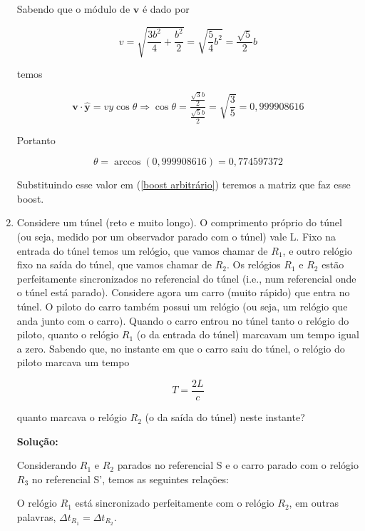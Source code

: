 \documentclass[10pt,a4paper]{article}
\begin{document}
\begin{enumerate}
Sabendo que o módulo de $\mathbf{v}$ é dado por 

\begin{equation}
v = \sqrt{\frac{3b^2}{4}+\frac{b^2}{2}} = \sqrt{\frac{5}{4}b^2} = \frac{\sqrt{5}}{2}b
\end{equation}

temos

\begin{equation}
\mathbf{v}\cdot\mathbf{\hat{y}} = vy\cos\theta \Rightarrow \cos\theta = \frac{\frac{\sqrt{3}b}{2}}{\frac{\sqrt{5}b}{2}} = \sqrt{\frac{3}{5}} = 0,999908616 
\end{equation}

Portanto 

\begin{equation}
\theta = \arccos(0,999908616) = 0,774597372
\end{equation}
	
	
Substituindo esse valor em (\ref{boost arbitrário}) teremos a matriz que faz esse boost.
	\item Considere um túnel (reto e muito longo). O comprimento próprio do túnel (ou seja, medido por um observador parado com o túnel) vale L. Fixo na entrada do túnel temos um relógio, que vamos chamar de $R_1$, e outro relógio fixo na saída do túnel, que vamos chamar de $R_2$. Os relógios $R_1$ e $R_2$ estão perfeitamente sincronizados no referencial do túnel (i.e., num referencial onde o túnel está parado). Considere agora um carro (muito rápido) que entra no túnel. O piloto do carro também possui um relógio (ou seja, um relógio que anda junto com o carro). Quando o carro entrou no túnel tanto o relógio do piloto, quanto o relógio $R_1$ (o da entrada do túnel) marcavam um tempo igual a zero. Sabendo que, no instante em que o carro saiu do túnel, o relógio do piloto marcava um tempo
	
	\begin{equation}
	T = \frac{2L}{c}
	\end{equation}
	
	quanto marcava o relógio $R_2$ (o da saída do túnel) neste instante?
	
	\textbf{Solução:}
	
	Considerando $ R_1 $ e $ R_2 $ parados no referencial S e o carro parado com o relógio $ R_3 $ no referencial S', temos as seguintes relações:
	
	O relógio $ R_1 $ está sincronizado perfeitamente com o relógio $ R_2 $, em outras palavras, $ \Delta t_{R_1} = \Delta t_{R_2}$.
	

\end{enumerate}
\end{document}
